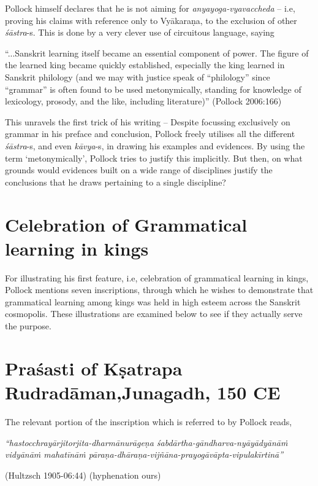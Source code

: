 Pollock himself declares that he is not aiming for {\sl anyayoga-vyavaccheda} -- i.e, proving his claims with reference only to Vyākaraṇa, to the exclusion of other {\sl śāstra}-s. This is done by a very clever use of circuitous language, saying 
\begin{myquote}
``...Sanskrit learning itself became an essential component of power. The figure of the learned king became quickly established, especially the king learned in Sanskrit philology (and we may with justice speak of ``philology'' since ``grammar'' is often found to be used metonymically, standing for knowledge of lexicology, prosody, and the like, including literature)''
\hfill (Pollock 2006:166)
\end{myquote}

This unravels the first trick of his writing -- Despite focussing exclusively on grammar in his preface and conclusion, Pollock freely utilises all the different {\sl śāstra}-s, and even {\sl kāvya}-s, in drawing his examples and evidences. By using the term `metonymically', Pollock tries to justify this implicitly. But then, on what grounds would evidences built on a wide range of disciplines justify the conclusions that he draws pertaining to a single discipline?

\section*{Celebration of Grammatical learning in kings}

For illustrating his first feature, i.e, celebration of grammatical learning in kings, Pollock mentions seven inscriptions, through which he wishes to demonstrate that grammatical learning among kings was held in high esteem across the Sanskrit cosmopolis. These illustrations are examined below to see if they actually serve the purpose. 

\section{Praśasti of Kṣatrapa Rudradāman,\newline Junagadh, 150 CE}\label{chap3-sec1}

The relevant portion of the inscription which is referred to by Pollock reads,
\begin{myquote}
{{\sl ``hastocchrayārjitorjita-dharmānurāgeṇa śabdārtha-gāndharva-nyāyādyānāṁ vidyānāṁ mahatīnāṁ pāraṇa-dhāraṇa-vijñāna-prayogāvāpta-vipulakīrtinā''}}

\hfill (Hultzsch 1905-06:44) (hyphenation ours)
\end{myquote}

